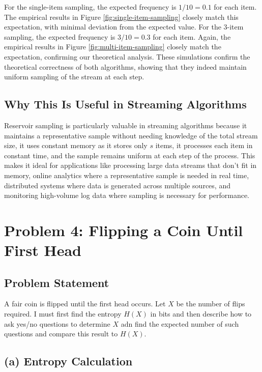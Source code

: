 \documentclass{article}
\begin{document}
For the single-item sampling, the expected frequency is $1/10 = 0.1$ for each item. The empirical results in Figure \ref{fig:single-item-sampling} closely match this expectation, with minimal deviation from the expected value. For the 3-item sampling, the expected frequency is $3/10 = 0.3$ for each item. Again, the empirical results in Figure \ref{fig:multi-item-sampling} closely match the expectation, confirming our theoretical analysis. These simulations confirm the theoretical correctness of both algorithms, showing that they indeed maintain uniform sampling of the stream at each step.

\subsection{Why This Is Useful in Streaming Algorithms}

Reservoir sampling is particularly valuable in streaming algorithms because it maintains a representative sample without needing knowledge of the total stream size, it uses constant memory as it stores only $s$ items, it processes each item in constant time, and the sample remains uniform at each step of the process. This makes it ideal for applications like processing large data streams that don't fit in memory, online analytics where a representative sample is needed in real time, distributed systems where data is generated across multiple sources, and monitoring high-volume log data where sampling is necessary for performance.

\section{Problem 4: Flipping a Coin Until First Head}

\subsection{Problem Statement}
A fair coin is flipped until the first head occurs. Let $X$ be the number of flips required. I must first find the entropy $H(X)$ in bits and then describe how to ask yes/no questions to determine $X$ adn find the expected number of such questions and compare this result to $H(X)$.

\subsection{(a) Entropy Calculation}
\end{document}
